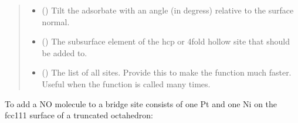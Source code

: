 \documentclass[letterpaper,10pt,english]{sphinxmanual}
\begin{document}
\begin{fulllineitems}
\begin{quote}
\begin{description}
\begin{itemize}
\item {} 
 (\sphinxstyleliteralemphasis{\sphinxupquote{, }}) \textendash{} Tilt the adsorbate with an angle (in degress) relative to
the surface normal.

\item {} 
 (\sphinxstyleliteralemphasis{\sphinxupquote{, }}) \textendash{} The subsurface element of the hcp or 4fold hollow site that
should be added to.

\item {} 
 (\sphinxstyleliteralemphasis{\sphinxupquote{, }}) \textendash{} The list of all sites. Provide this to make the function
much faster. Useful when the function is called many times.

\end{itemize}

\end{description}\end{quote}

\end{fulllineitems}



To add a NO molecule to a bridge site consists of one Pt and
one Ni on the fcc111 surface of a truncated octahedron:
\end{document}
